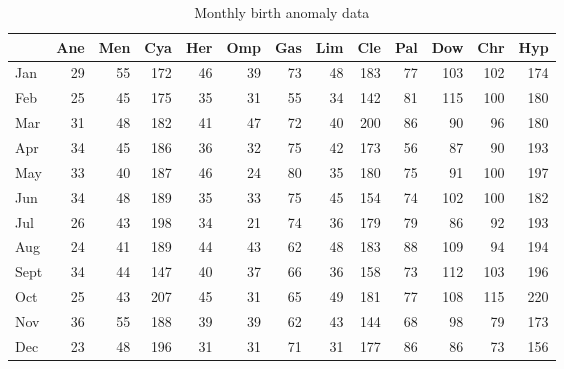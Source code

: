 \documentclass[article,nojss]{jss}\usepackage[]{graphicx}\usepackage[]{color}
\begin{document}
 
\begin{table}

\caption{\label{tab:monthdata}Monthly birth anomaly data\label{tab:month}}
\centering
\begin{tabular}[t]{lrrrrrrrrrrrr}
\toprule
  & Ane & Men & Cya & Her & Omp & Gas & Lim & Cle & Pal & Dow & Chr & Hyp\\
\midrule
Jan & 29 & 55 & 172 & 46 & 39 & 73 & 48 & 183 & 77 & 103 & 102 & 174\\
Feb & 25 & 45 & 175 & 35 & 31 & 55 & 34 & 142 & 81 & 115 & 100 & 180\\
Mar & 31 & 48 & 182 & 41 & 47 & 72 & 40 & 200 & 86 & 90 & 96 & 180\\
Apr & 34 & 45 & 186 & 36 & 32 & 75 & 42 & 173 & 56 & 87 & 90 & 193\\
May & 33 & 40 & 187 & 46 & 24 & 80 & 35 & 180 & 75 & 91 & 100 & 197\\
Jun & 34 & 48 & 189 & 35 & 33 & 75 & 45 & 154 & 74 & 102 & 100 & 182\\
Jul & 26 & 43 & 198 & 34 & 21 & 74 & 36 & 179 & 79 & 86 & 92 & 193\\
Aug & 24 & 41 & 189 & 44 & 43 & 62 & 48 & 183 & 88 & 109 & 94 & 194\\
Sept & 34 & 44 & 147 & 40 & 37 & 66 & 36 & 158 & 73 & 112 & 103 & 196\\
Oct & 25 & 43 & 207 & 45 & 31 & 65 & 49 & 181 & 77 & 108 & 115 & 220\\
Nov & 36 & 55 & 188 & 39 & 39 & 62 & 43 & 144 & 68 & 98 & 79 & 173\\
Dec & 23 & 48 & 196 & 31 & 31 & 71 & 31 & 177 & 86 & 86 & 73 & 156\\
\bottomrule
\end{tabular}
\end{table}
\end{document}
